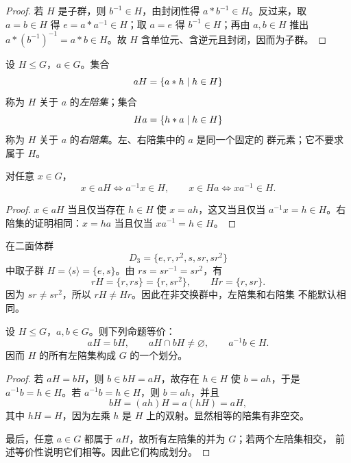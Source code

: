 \begin{proof}
  若 $H$ 是子群，则 $b^{-1}\in H$，由封闭性得 $a*b^{-1}\in H$。反过来，取 $a=b\in H$ 得 $e=a*a^{-1}\in H$；取 $a=e$ 得 $b^{-1}\in H$；再由 $a,b\in H$ 推出 $a*(b^{-1})^{-1}=a*b\in H$。故 $H$ 含单位元、含逆元且封闭，因而为子群。
\end{proof}

\begin{definition}[左陪集与右陪集]\label{left-right-cosets}
  设 $H\le G$，$a\in G$。集合
  \[
  aH=\{a*h\mid h\in H\}
  \]
  称为 $H$ 关于 $a$ 的\emph{左陪集}；集合
  \[
  Ha=\{h*a\mid h\in H\}
  \]
  称为 $H$ 关于 $a$ 的\emph{右陪集}。左、右陪集中的 $a$ 是同一个固定的
  群元素；它不要求属于 $H$。
\end{definition}

\begin{theorem}[陪集的元素判定]\label{coset-membership}
  对任意 $x\in G$，
  \[
  x\in aH\Longleftrightarrow a^{-1}x\in H,
  \qquad
  x\in Ha\Longleftrightarrow xa^{-1}\in H.
  \]
\end{theorem}

\begin{proof}
  $x\in aH$ 当且仅当存在 $h\in H$ 使 $x=ah$，这又当且仅当
  $a^{-1}x=h\in H$。右陪集的证明相同：$x=ha$ 当且仅当
  $xa^{-1}=h\in H$。
\end{proof}

\begin{example}[title={左、右陪集可以不同}]\label{left-right-coset-example}
  在二面体群
  \[
  D_3=\{e,r,r^2,s,sr,sr^2\}
  \]
  中取子群 $H=\langle s\rangle=\{e,s\}$。由 $rs=sr^{-1}=sr^2$，有
  \[
  rH=\{r,rs\}=\{r,sr^2\},
  \qquad
  Hr=\{r,sr\}.
  \]
  因为 $sr\ne sr^2$，所以 $rH\ne Hr$。因此在非交换群中，左陪集和右陪集
  不能默认相同。
\end{example}

\begin{theorem}[陪集的判定与划分]\label{coset-partition}
  设 $H\le G$，$a,b\in G$。则下列命题等价：
  \[
  aH=bH,\qquad aH\cap bH\ne\varnothing,\qquad a^{-1}b\in H.
  \]
  因而 $H$ 的所有左陪集构成 $G$ 的一个划分。
\end{theorem}

\begin{proof}
  若 $aH=bH$，则 $b\in bH=aH$，故存在 $h\in H$ 使 $b=ah$，于是
  $a^{-1}b=h\in H$。若 $a^{-1}b=h\in H$，则 $b=ah$，并且
  \[
  bH=(ah)H=a(hH)=aH,
  \]
  其中 $hH=H$，因为左乘 $h$ 是 $H$ 上的双射。显然相等的陪集有非空交。

  最后，任意 $a\in G$ 都属于 $aH$，故所有左陪集的并为 $G$；若两个左陪集相交，
  前述等价性说明它们相等。因此它们构成划分。
\end{proof}

